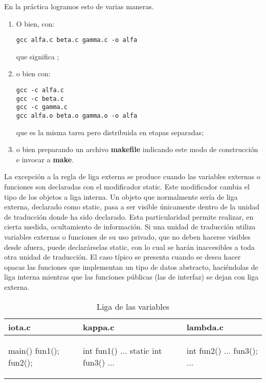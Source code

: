 En la práctica logramos esto de varias maneras.
\begin{enumerate}
	\item O bien, con:
\begin{lstlisting}
gcc alfa.c beta.c gamma.c -o alfa
\end{lstlisting}

que significa ; 
\item o bien con:

\begin{lstlisting}
gcc -c alfa.c
gcc -c beta.c
gcc -c gamma.c
gcc alfa.o beta.o gamma.o -o alfa
\end{lstlisting}

que es la misma tarea pero distribuida en etapas separadas;
\item o bien preparando un archivo \textbf{makefile} indicando este modo de construcción e invocar a \textbf{make}.
\end{enumerate}

La excepción a la regla de liga externa se produce cuando las variables externas o funciones son
declaradas con el modificador static. Este modificador cambia el tipo de los objetos a liga interna. Un
objeto que normalmente sería de liga externa, declarado como static, pasa a ser visible únicamente
dentro de la unidad de traducción donde ha sido declarado.
Esta particularidad permite realizar, en cierta medida, ocultamiento de información. Si una unidad de
traducción utiliza variables externas o funciones de su uso privado, que no deben hacerse visibles
desde afuera, puede declarárselas static, con lo cual se harán inaccesibles a toda otra unidad de
traducción. El caso típico se presenta cuando se desea hacer opacas las funciones que implementan un
tipo de datos abstracto, haciéndolas de liga interna mientras que las funciones públicas (las de interfaz)
se dejan con liga externa.


\begin{ejemplo}
\begin{table}
\centering	
\begin{tabular}{l|l|l}
iota.c & kappa.c & lambda.c \\
\hline
\begin{codecell}
main()
{
	fun1();
	fun2();
}
\end{codecell}
&
\begin{codecell}
int fun1()
{
	...
}
static int fun3()
{
	...
}
\end{codecell}
&
\begin{codecell}
int fun2()
{
	...
	fun3();
	...
}
\end{codecell}
\\
\end{tabular}
 \caption{Liga de las variables}
 \label{tab:ejliga2} 
\end{table}
\end{ejemplo}

